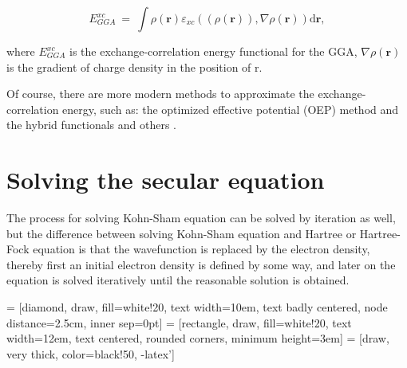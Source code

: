 \documentclass[a4paper, 12pt, titlepage,oneside,drop]{kthesis}
\begin{document}
\begin{equation}
E_{\textit{GGA}}^{\textit{xc}}\ = \ \int \rho(\textbf{r}) \varepsilon_\textit{xc}( (\rho(\textbf{r})), \nabla \rho(\textbf{r}) ) \mathrm{d} \textbf{r}, 
\end{equation}

\noindent where $E_{\textit{GGA}}^{\textit{xc}}$ is the exchange-correlation energy functional for the GGA, $\nabla \rho(\textbf{r})$ is the gradient  of charge density in the position of r.

\noindent Of course, there are more modern methods to approximate the exchange-correlation energy, such as: the optimized effective potential
(OEP) method and the hybrid functionals and others			.

\section{Solving the secular equation}
\noindent The process for solving Kohn-Sham equation can be solved by iteration as well, but the difference between solving Kohn-Sham 
equation and Hartree or Hartree-Fock equation is that the wavefunction is replaced by the electron density, thereby first an initial 
electron density is defined by some way, and later on the equation is solved iteratively until the reasonable solution is obtained.

 = [diamond, draw, fill=white!20,
    text width=10em, text badly centered, node distance=2.5cm, inner sep=0pt]
 = [rectangle, draw, fill=white!20,
    text width=12em, text centered, rounded corners, minimum height=3em]
 = [draw, very thick, color=black!50, -latex']
\end{document}
